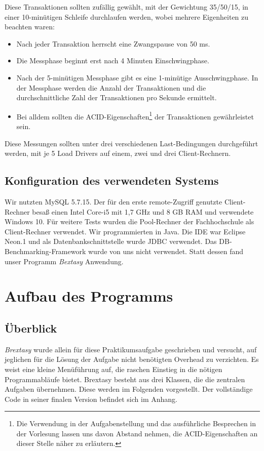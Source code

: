 \documentclass[a4paper, bibliography=totoc, 12pt]{scrartcl}
\begin{document}
\noindent
Diese Transaktionen sollten zufällig gewählt, mit der Gewichtung 35/50/15, in einer 10-minütigen Schleife durchlaufen werden, wobei mehrere Eigenheiten zu beachten waren:
\begin{itemize}
\itemsep0pt
\item Nach jeder Transaktion herrscht eine Zwangspause von 50 ms.
\item Die Messphase beginnt erst nach 4 Minuten \glqq Einschwingphase\grqq .
\item Nach der 5-minütigen Messphase gibt es eine 1-minütige \glqq Ausschwingphase\grqq . In der Messphase werden die Anzahl der Transaktionen und die durchschnittliche Zahl der Transaktionen pro Sekunde ermittelt. %
\item Bei alldem sollten die ACID-Eigenschaften\footnote{Die Verwendung in der Aufgabenstellung und das ausführliche Besprechen in der Vorlesung lassen uns davon Abstand nehmen, die ACID-Eigenschaften an dieser Stelle näher zu erläutern.} der Transaktionen gewährleistet sein.
\end{itemize}

\noindent
Diese Messungen sollten unter drei verschiedenen Last-Bedingungen durchgeführt werden, mit je 5 Load Drivers auf einem, zwei und drei Client-Rechnern. 

\subsection{Konfiguration des verwendeten Systems}
Wir nutzten MySQL 5.7.15. Der für den erste remote-Zugriff genutzte Client-Rechner besaß einen Intel Core-i5 mit 1,7 GHz und 8 GB RAM und verwendete Windows 10. Für weitere Tests wurden die Pool-Rechner der Fachhochschule als Client-Rechner verwendet. Wir programmierten in Java. Die IDE war Eclipse Neon.1 und als Datenbankschnittstelle wurde JDBC verwendet. Das DB-Benchmarking-Framework wurde von uns nicht verwendet. %
Statt dessen fand unser Programm \emph{Bextasy} Anwendung.

\section{Aufbau des Programms}
	\subsection{Überblick}
		\emph{Brextasy} wurde allein für diese Praktikumsaufgabe geschrieben und versucht, auf jeglichen für die Lösung der Aufgabe nicht benötigten Overhead zu verzichten. Es weist eine kleine Menüführung auf, die raschen Einstieg in die nötigen Programmabläufe bietet.
		Brextasy besteht aus drei Klassen, die die zentralen Aufgaben übernehmen. Diese werden im Folgenden vorgestellt. Der vollständige Code in seiner finalen Version befindet sich im Anhang.
\end{document}
